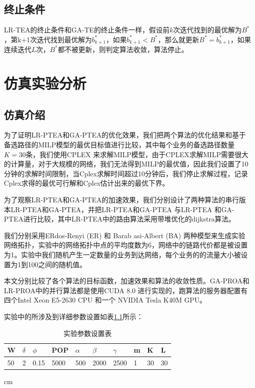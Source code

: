 \subsection{终止条件}
LR-TEA的终止条件和GA-TE的终止条件一样，假设前$k$次迭代找到的最优解为$B^*$，第k+1次迭代找到最优解为$b_{k+1}^*$，如果$b_{k+1}^*<B^*$，那么就更新$B^*=b_{k+1}^*$，如果连续迭代$L$次，$B^*$都不被更新，则判定算法收敛，算法停止。
\section{仿真实验分析}

\subsection {仿真介绍}

为了证明LR-PTEA和GA-PTEA的优化效果，我们把两个算法的优化结果和基于备选路径的MILP模型的最优目标值进行比较，其中每个业务的备选路径数量$K=30$条，我们使用CPLEX 来求解MILP模型，由于CPLEX求解MILP需要很大的计算量，对于大规模的网络，我们无法得到MILP的最优值，因此我们设置了10分钟的求解时间限制，当Cplex求解时间超过10分钟后，我们停止求解过程，记录Cplex求得的最优可行解和Cplex估计出来的最优下界。

为了观察LR-PTEA和GA-PTEA的加速效果，我们分别设计了两种算法的串行版本LR-PTEA和GA-PTEA，并把LR-PTEA和GA-PTEA 与LR-PTEA 和GA-PTEA进行比较，其中LR-PTEA中的路由算法采用带堆优化的dijkstra算法。

我们分别采用ERdos-Renyi (ER) 和 Barab asi-Albert (BA) 两种模型来生成实验网络拓扑，实验中的网络拓扑中点的平均度数为6，网络中的链路代价都是被设置为1。实验中我们随机产生一定数量的业务到达网络，每个业务的的流量大小被设置为1到100之间的随机值。

本文分别比较了各个算法的目标函数，加速效果和算法的收敛性质。GA-PROA和LR-PROA中的并行算法都是使用CUDA 8.0 进行实现的，跑算法的服务器配置有四个Intel Xeon E5-2630 CPU 和一个 NVIDIA Tesla K40M GPU。

实验中的所涉及到详细参数设置如表\ref{}所示：

\begin{table}[t]
\newcommand{\tabincell}[2]{\begin{tabular}{@{}#1@{}}#2\end{tabular}}
\setlength{\abovecaptionskip}{0.2cm}
\centering
\scriptsize{
\renewcommand{\tabcolsep}{0.09cm}
\renewcommand{\arraystretch}{1.2}
\caption{实验参数设置表}
\begin{tabular}{| p{1.2cm} | p{1.2cm} | p{1.2cm} | p{1.2cm} | p{1.2cm} | p{1.2cm} | p{1.2cm} | p{1.2cm} | p{1.2cm} | p{1.2cm} |}
\hline
W&$\delta$&$\phi$&POP&$\alpha$&$\beta$&$\gamma$&m&K&L\\ \hline
50&2&0.15&5000&500&2000&2500&1&30&30\\ \hline
\end{tabular}
 cm
\label{Iterprocess2}
}
\end{table}

